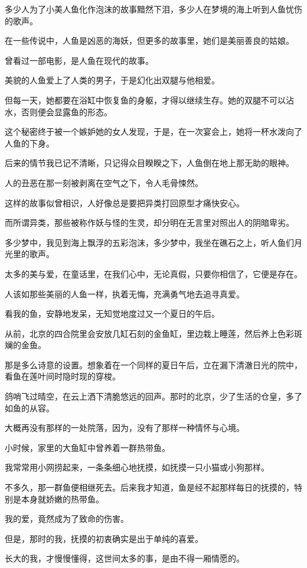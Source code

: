 \documentclass[12pt,a4paper]{article}
\def\blankrev{\vspace{1ex}}									%
\begin{document}
		\blankrev
		多少人为了小美人鱼化作泡沫的故事黯然下泪，多少人在梦境的海上听到人鱼忧伤的歌声。\par
		在一些传说中，人鱼是凶恶的海妖，但更多的故事里，她们是美丽善良的姑娘。

		\blankrev
		曾看过一部电影，是人鱼在现代的故事。\par
		美貌的人鱼爱上了人类的男子，于是幻化出双腿与他相爱。\par
		但每一天，她都要在浴缸中恢复鱼的身躯，才得以继续生存。她的双腿不可以沾水，否则便会显露鱼的形态。\par
		这个秘密终于被一个嫉妒她的女人发现，于是，在一次宴会上，她将一杯水泼向了人鱼的下身。\par
		后来的情节我已记不清晰，只记得众目睽睽之下，人鱼倒在地上那无助的眼神。\par
		人的丑恶在那一刻被剥离在空气之下，令人毛骨悚然。

		\blankrev
		这样的故事似曾相识，人好像总是要把异类打回原型才痛快安心。\par
		而所谓异类，那些被称作妖与怪的生灵，却分明在无言里对照出人的阴暗卑劣。\par
		多少梦中，我见到海上飘浮的五彩泡沫，多少梦中，我坐在礁石之上，听人鱼们月光里的歌声。

		\blankrev
		太多的美与爱，在童话里，在我们心中，无论真假，只要你相信了，它便是存在。\par
		人该如那些美丽的人鱼一样，执着无悔，充满勇气地去追寻真爱。

		\blankrev
		看我的鱼，安静地发呆，无知觉地度过又一个夏日的午后。\par
		从前，北京的四合院里会安放几缸石刻的金鱼缸，里边栽上睡莲，然后养上色彩斑斓的金鱼。\par
		那是多么诗意的设置。想象着在一个同样的夏日午后，立在漏下清澈日光的院中，看鱼在莲叶间时隐时现的穿梭。\par
		鸽哨飞过晴空，在云上洒下清脆悠远的回声。那时的北京，少了生活的仓皇，多了如鱼的从容。\par
		大概再没有那样的一处院落，因为，没有了那样一种情怀与心境。

		\blankrev
		小时候，家里的大鱼缸中曾养着一群热带鱼。\par
		我常常用小网捞起来，一条条细心地抚摸，如抚摸一只小猫或小狗那样。\par
		不多久，那一群鱼便相继死去。后来我才知道，鱼是经不起那样每日的抚摸的，特别是本身就娇嫩的热带鱼。

		\blankrev
		我的爱，竟然成为了致命的伤害。\par
		但是，那时的我，抚摸的初衷确实是出于单纯的喜爱。\par
		长大的我，才慢慢懂得，这世间太多的事，是由不得一厢情愿的。
\end{document}

